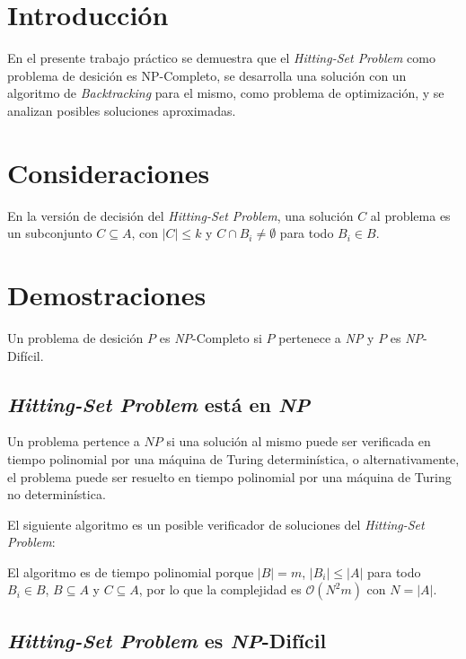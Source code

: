 \section{Introducci\'on}

En el presente trabajo pr\'actico se demuestra que el \textit{Hitting-Set
Problem} como problema de desici\'on es NP-Completo, se desarrolla una
soluci\'on con un algoritmo de \textit{Backtracking} para el mismo, como
problema de optimizaci\'on, y se analizan posibles soluciones aproximadas.

\section{Consideraciones}

En la versi\'on de decisi\'on del \textit{Hitting-Set Problem}, una soluci\'on
$C$ al problema es un subconjunto $C \subseteq A$, con $|C| \le k$ y $C \cap
B_i \ne \emptyset$ para todo $B_i \in B$.

\section{Demostraciones}

Un problema de desici\'on $P$ es \textit{NP}-Completo si $P$ pertenece a
\textit{NP} y $P$ es \textit{NP}-Dif\'icil.

\subsection{\textit{Hitting-Set Problem} est\'a en \textit{NP}}

Un problema pertence a $NP$ si una soluci\'on al mismo puede ser verificada en
tiempo polinomial por una m\'aquina de Turing determin\'istica, o
alternativamente, el problema puede ser resuelto en tiempo polinomial por una
m\'aquina de Turing no determin\'istica.

El siguiente algoritmo es un posible verificador de soluciones del
\textit{Hitting-Set Problem}:



El algoritmo es de tiempo polinomial porque $|B| = m$, $|B_i| \le |A|$ para
todo $B_i \in B$, $B \subseteq A$ y $C \subseteq A$, por lo que la complejidad
es $\mathcal{O}(N^2m)$ con $N = |A|$.

\subsection{\textit{Hitting-Set Problem} es \textit{NP}-Dif\'icil}

